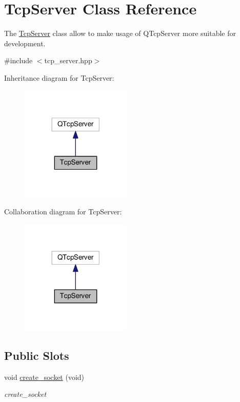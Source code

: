 \hypertarget{class_tcp_server}{}\section{Tcp\+Server Class Reference}
\label{class_tcp_server}


The \hyperlink{class_tcp_server}{Tcp\+Server} class allow to make usage of Q\+Tcp\+Server more suitable for development.  




{\ttfamily \#include $<$tcp\+\_\+server.\+hpp$>$}



Inheritance diagram for Tcp\+Server\+:
\nopagebreak
\begin{figure}[H]
\begin{center}
\leavevmode
\includegraphics[width=149pt]{class_tcp_server__inherit__graph}
\end{center}
\end{figure}


Collaboration diagram for Tcp\+Server\+:
\nopagebreak
\begin{figure}[H]
\begin{center}
\leavevmode
\includegraphics[width=149pt]{class_tcp_server__coll__graph}
\end{center}
\end{figure}
\subsection*{Public Slots}
\begin{DoxyCompactItemize}
\item 
void \hyperlink{class_tcp_server_a90ee8945eb2ceec552f5f7a850fd9dce}{create\+\_\+socket} (void)
\begin{DoxyCompactList}\small\item\em create\+\_\+socket \end{DoxyCompactList}\end{DoxyCompactItemize}
